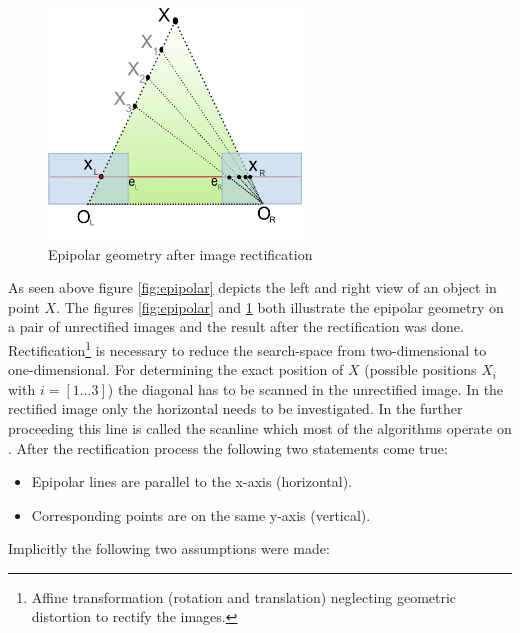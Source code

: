 \begin{figure}[h!]
  \centering
  \includegraphics[width=0.6\textwidth]{src/images/epipolar-rectified.png}
  \caption[Epipolar geometry after image rectification]{Epipolar geometry after image rectification\protect\footnotemark}
  \label{fig:epipolar-rectified}
\end{figure}

\noindent As seen above figure \ref{fig:epipolar} depicts the left and right view of an object in point $X$.
The figures \ref{fig:epipolar} and \ref{fig:epipolar-rectified} both illustrate the epipolar geometry on a pair of unrectified images and the result after the rectification was done.
Rectification\footnote{Affine transformation (rotation and translation) neglecting geometric distortion to rectify the images.} is necessary to reduce the search-space from two-dimensional to one-dimensional.
For determining the exact position of $X$ (possible positions $X_i$ with $i = [1 \dots 3]$) the diagonal has to be scanned in the unrectified image.
In the rectified image only the horizontal needs to be investigated.
In the further proceeding this line is called the scanline which most of the algorithms operate on \citep{cyganek2011introduction, chowdhury2009new}.
After the rectification process the following two statements come true:

\begin{itemize}
  \item Epipolar lines are parallel to the x-axis (horizontal).
  \item Corresponding points are on the same y-axis (vertical).
\end{itemize}

\noindent Implicitly the following two assumptions were made:

